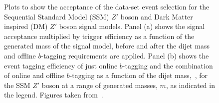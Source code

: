 \begin{figure}[!htb]
  \begin{center}
    \captionsetup[subfigure]{aboveskip=0pt,justification=centering}
  \end{center}
  \vspace{-1em}
  \caption[Plots to show the acceptance of the \lm{} data-set event selection for the SSM and DM $Z'$ boson signal models.]
          {Plots to show the acceptance of the \lm{} data-set event selection for the
            Sequential Standard Model (SSM) $Z'$ boson and Dark Matter inspired (DM) $Z'$ boson signal models.
            Panel (a) shows the signal acceptance multiplied by trigger efficiency as a
            function of the generated mass of the signal model, before and after the
            dijet mass and offline $b$-tagging requirements are applied.
            Panel (b) shows the event tagging efficiency of just online $b$-tagging and the combination of online and offline $b$-tagging
            as a function of the dijet mass,~\mjj, for the SSM $Z'$ boson 
            at a range of generated masses, $m$, as indicated in the legend.
            Figures taken from~\cite{dibjet-full}.} 
  \label{fig:evt-lm_acc}
\end{figure}

